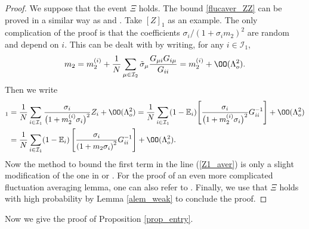 \begin{proof}
We suppose that the event $\Xi$ holds. The bound \eqref{flucaver_ZZ} can be proved in a similar way as \cite[Lemma 4.9]{isotropic} and \cite[Theorem 4.7]{Semicircle}. Take $[Z]_1$ as an example. The only complication of the proof is that the coefficients ${\sigma_i}/{(1+\sigma_i m_2)^2}$ are random and depend on $i$. This can be dealt with by writing, for any $i\in \mathcal I_1$,
$$m_2 = m_2^{(i)} + \frac{1}{N}\sum_{\mu\in\mathcal I_2} \tilde \sigma_\mu \frac{G_{\mu i} G_{i\mu}}{G_{ii}} = m_2^{(i)} + \OO(\Lambda_o^2).$$
Then we write
\begin{align}
[Z]_1 & =\frac{1}{N}\sum_{i\in \mathcal I_1} \frac{\sigma_i}{\big(1+m_2^{(i)}\sigma_i \big)^2} Z_i + \OO(\Lambda_o^2)  = \frac{1}{N}\sum_{i\in \mathcal I_1} (1-\mathbb E_i)\Bigg[\frac{\sigma_i}{\big(1+m_2^{(i)}\sigma_i\big)^2}G_{ii}^{-1}\Bigg]+ \OO(\Lambda_o^2) \nonumber\\
& = \frac{1}{N}\sum_{i\in \mathcal I_1} (1-\mathbb E_i)\left[\frac{\sigma_i}{\left(1+m_2 \sigma_i\right)^2}G_{ii}^{-1}\right] + \OO(\Lambda_o^2).\label{Z1_aver}
\end{align}
Now the method to bound the first term in the line (\ref{Z1_aver}) is only a slight modification of the one in \cite{isotropic} or \cite{Semicircle}. For the proof of an even more complicated fluctuation averaging lemma, one can also refer to \cite[Lemma 4.9]{XYY_circular}. Finally, we use that $\Xi$ holds with high probability by Lemma \ref{alem_weak} to conclude the proof. 
\end{proof}

Now we give the proof of Proposition \ref{prop_entry}.

